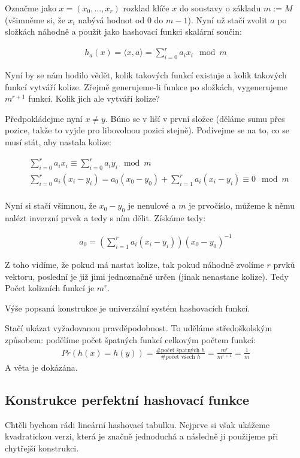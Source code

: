 \documentclass{article}
\begin{document}
Označme jako $x = (x_0, \dots, x_r)$ rozklad klíče $x$ do soustavy o základu $m 
:= M$ (všimněme si, že $x_i$ nabývá hodnot od $0$ do $m-1$). Nyní už stačí 
zvolit $a$ po složkách náhodně a použít jako hashovací funkci skalární součin:

\begin{align}
	h_a(x) = \langle x,a \rangle = \sum_{i=0}^r a_i x_i \mod m
\end{align}

Nyní by se nám hodilo vědět, kolik takových funkcí existuje a kolik takových 
funkcí vytváří kolize. Zřejmě generujeme-li funkce po složkách, vygenerujeme 
$m^{r+1}$ funkcí. Kolik jich ale vytváří kolize?

Předpokládejme nyní $x \neq y$. Búno se v liší v první složce (děláme sumu přes 
pozice, takže to vyjde pro libovolnou pozici stejně). Podívejme se na to, co se 
musí stát, aby nastala kolize:

\begin{align}
	&\sum_{i=0}^r a_i x_i \equiv \sum_{i=0}^r a_i y_i \mod m \\
	&\sum_{i=0}^r a_i (x_i - y_i) =  a_0 (x_0 - y_0) + \sum_{i=1}^r a_i (x_i - 
	y_i) \equiv 0 \mod m\\
\end{align}

Nyní si stačí všimnou, že $x_0 - y_0$ je nenulové a $m$ je prvočíslo, můžeme k 
němu nalézt inverzní prvek a tedy s ním dělit. Získáme tedy:

\begin{align}
	a_0 =  \left(\sum_{i=1}^r a_i (x_i - y_i)\right)(x_0 - y_0)^{-1}
\end{align}

Z toho vidíme, že pokud má nastat kolize, tak pokud náhodně zvolíme $r$ prvků 
vektoru, poslední je již jimi jednoznačně určen (jinak nenastane kolize). Tedy 
Počet kolizních funkcí je $m^r$.

\vt Výše popsaná konstrukce je univerzální systém hashovacích funkcí.

\dk Stačí ukázat vyžadovanou pravděpodobnost. To uděláme středoškolským 
způsobem: podělíme počet špatných funkcí celkovým počtem funkcí:
\begin{align}
	Pr(h(x) = h(y)) = \frac{\#\text{počet špatných }h}{\#\text{počet všech }h} = 
	\frac{m^{r}}{m^{r+1}} = \frac{1}{m}
\end{align}
A věta je dokázána.

\subsection{Konstrukce perfektní hashovací funkce}
Chtěli bychom rádi lineární hashovací tabulku. Nejprve si však ukážeme 
kvadratickou verzi, která je značně jednoduchá a následně ji použijeme při 
chytřejší konstrukci.
\end{document}
